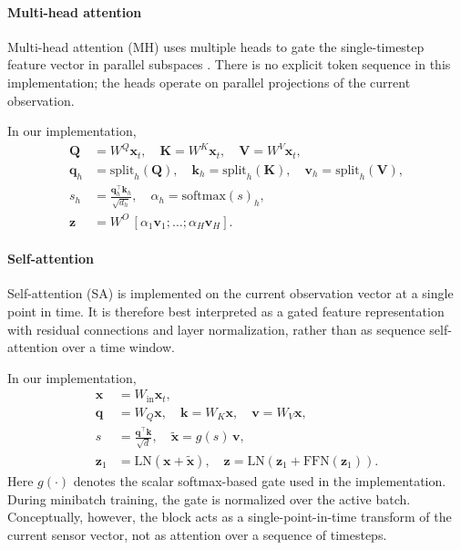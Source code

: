 \documentclass[sn-basic]{sn-jnl} %
\begin{document}
\paragraph{Multi-head attention}
Multi-head attention (MH) uses multiple heads to gate the single-timestep feature vector in parallel subspaces \cite{Vaswani2017}. There is no explicit token sequence in this implementation; the heads operate on parallel projections of the current observation.

In our implementation,
\begin{align}
        \mathbf{Q}&=W^Q\mathbf{x}_t,\quad \mathbf{K}=W^K\mathbf{x}_t,\quad \mathbf{V}=W^V\mathbf{x}_t,\\
        \mathbf{q}_h&=\mathrm{split}_h(\mathbf{Q}),\quad \mathbf{k}_h=\mathrm{split}_h(\mathbf{K}),\quad \mathbf{v}_h=\mathrm{split}_h(\mathbf{V}),\\
        s_h&=\frac{\mathbf{q}_h^\top\mathbf{k}_h}{\sqrt{d_h}},\quad \alpha_h=\mathrm{softmax}(s)_h,\\
        \mathbf{z}&=W^O\,[\alpha_1\mathbf{v}_1;\ldots;\alpha_H\mathbf{v}_H].
\end{align}

\paragraph{Self-attention}
Self-attention (SA) is implemented on the current observation vector at a single point in time. It is therefore best interpreted as a gated feature representation with residual connections and layer normalization, rather than as sequence self-attention over a time window.

In our implementation,
\begin{align}
        \mathbf{x} &= W_{\mathrm{in}}\mathbf{x}_t,\\
        \mathbf{q} &= W_Q\mathbf{x},\quad \mathbf{k}=W_K\mathbf{x},\quad \mathbf{v}=W_V\mathbf{x},\\
        s &= \frac{\mathbf{q}^\top\mathbf{k}}{\sqrt{d}},\quad \tilde{\mathbf{x}} = g(s)\,\mathbf{v},\\
        \mathbf{z}_1 &= \mathrm{LN}\!\left(\mathbf{x}+\tilde{\mathbf{x}}\right),\quad
        \mathbf{z}=\mathrm{LN}\!\left(\mathbf{z}_1+\mathrm{FFN}(\mathbf{z}_1)\right).
\end{align}
Here $g(\cdot)$ denotes the scalar softmax-based gate used in the implementation. During minibatch training, the gate is normalized over the active batch. Conceptually, however, the block acts as a single-point-in-time transform of the current sensor vector, not as attention over a sequence of timesteps.
\end{document}
